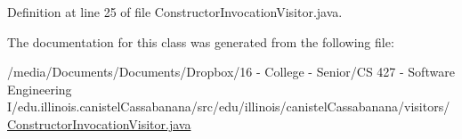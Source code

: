 Definition at line 25 of file ConstructorInvocationVisitor.java.



The documentation for this class was generated from the following file:\begin{DoxyCompactItemize}
\item 
/media/Documents/Documents/Dropbox/16 -\/ College -\/ Senior/CS 427 -\/ Software Engineering I/edu.illinois.canistelCassabanana/src/edu/illinois/canistelCassabanana/visitors/\hyperlink{ConstructorInvocationVisitor_8java}{ConstructorInvocationVisitor.java}\end{DoxyCompactItemize}
